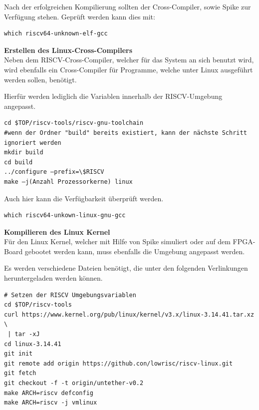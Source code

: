 Nach der erfolgreichen Kompilierung sollten der Cross-Compiler, sowie Spike zur Verfügung stehen. Geprüft werden kann dies mit:\\

\begin{lstlisting}[caption={Überprüfung der Erreichbarkeit des Compilers},label={code:elfgcc}]
which riscv64-unknown-elf-gcc
\end{lstlisting}


\vspace{5mm}
\textbf{Erstellen des Linux-Cross-Compilers}\\

Neben dem RISCV-Cross-Compiler, welcher für das System an sich benutzt wird, wird ebenfalls ein Cross-Compiler für Programme, welche unter Linux ausgeführt werden sollen, benötigt.

Hierfür werden lediglich die Variablen innerhalb der RISCV-Umgebung angepasst.\\

\begin{lstlisting}[caption={Anpassung der RISCV-Umgebung},label={code:riscvumgebung},extendedchars=false]
cd $TOP/riscv-tools/riscv-gnu-toolchain
#wenn der Ordner "build" bereits existiert, kann der nächste Schritt ignoriert werden
mkdir build
cd build
../configure –prefix=\$RISCV
make –j(Anzahl Prozessorkerne) linux
\end{lstlisting}

\newpage
Auch hier kann die Verfügbarkeit überprüft werden.\\

\begin{lstlisting}[caption={Überprüfung der Erreichbarkeit des Linux-Compilers},label={code:linuxgcc}]
which riscv64-unkown-linux-gnu-gcc
\end{lstlisting}

\vspace{5mm}

 \textbf{Kompilieren des Linux Kernel}\\

Für den Linux Kernel, welcher mit Hilfe von Spike simuliert oder auf dem FPGA-Board gebootet werden kann, muss ebenfalls die Umgebung angepasst werden.

Es werden verschiedene Dateien benötigt, die unter den folgenden Verlinkungen heruntergeladen werden können.\\

\begin{lstlisting}[caption={Download und Anpassung des Kernels},label={code:kernelkonf}]
# Setzen der RISCV Umgebungsvariablen
cd $TOP/riscv-tools
curl https://www.kernel.org/pub/linux/kernel/v3.x/linux-3.14.41.tar.xz \
 | tar -xJ
cd linux-3.14.41
git init
git remote add origin https://github.con/lowrisc/riscv-linux.git
git fetch
git checkout -f -t origin/untether-v0.2
make ARCH=riscv defconfig
make ARCH=riscv -j vmlinux
\end{lstlisting}

